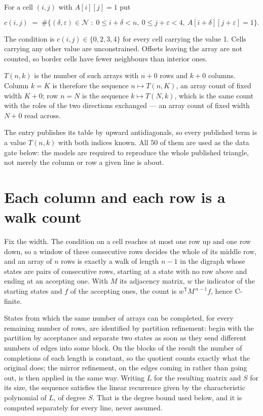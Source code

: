 \documentclass[11pt]{article}
\theoremstyle{definition}
\begin{document}
For a cell $(i,j)$ with $A[i][j] = 1$ put

\[c(i,j) \;=\; \#\bigl\{(\delta,\varepsilon)\in\mathcal{N} \;:\; 0\le i+\delta<n,\ 0\le j+\varepsilon<4,\ A[i+\delta][j+\varepsilon] = 1\bigr\}.\]

The condition is $c(i,j) \in \{0, 2, 3, 4\}$ for every cell carrying the value 1. Cells carrying any other value are unconstrained. Offsets leaving the array are not counted, so border cells have fewer neighbours than interior ones.

$T(n,k)$ is the number of such arrays with $n + 0$ rows and $k + 0$ columns. Column $k = K$ is therefore the sequence $n \mapsto T(n,K)$, an array count of fixed width $K + 0$; row $n = N$ is the sequence $k \mapsto T(N,k)$, which is the same count with the roles of the two directions exchanged --- an array count of fixed width $N + 0$ read across.

The entry publishes its table by upward antidiagonals, so every published term is a value $T(n,k)$ with both indices known. All 50 of them are used as the data gate below: the models are required to reproduce the whole published triangle, not merely the column or row a given line is about.

\section{Each column and each row is a walk count}

Fix the width. The condition on a cell reaches at most one row up and one row down, so a window of three consecutive rows decides the whole of its middle row, and an array of $n$ rows is exactly a walk of length $n-1$ in the digraph whose states are pairs of consecutive rows, starting at a state with no row above and ending at an accepting one. With $M$ its adjacency matrix, $w$ the indicator of the starting states and $f$ of the accepting ones, the count is $w^{\mathsf T}M^{\,n-1}f$, hence C-finite.

States from which the same number of arrays can be completed, for every remaining number of rows, are identified by partition refinement: begin with the partition by acceptance and separate two states as soon as they send different numbers of edges into some block. On the blocks of the result the number of completions of each length is constant, so the quotient counts exactly what the original does; the mirror refinement, on the edges coming in rather than going out, is then applied in the same way. Writing $L$ for the resulting matrix and $S$ for its size, the sequence satisfies the linear recurrence given by the characteristic polynomial of $L$, of degree $S$. That is the degree bound used below, and it is computed separately for every line, never assumed.
\end{document}
